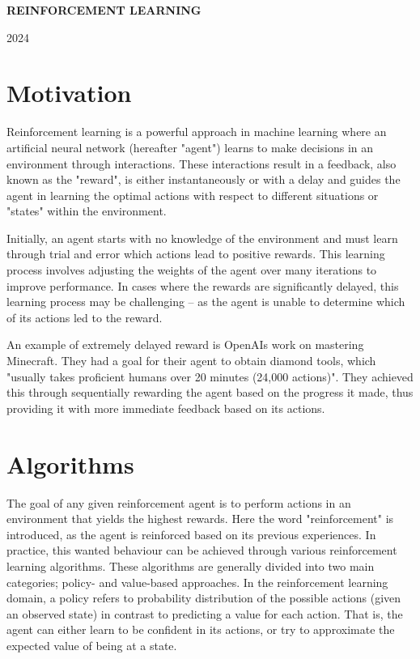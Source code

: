 \documentclass{article}
\let\oldcite\cite
\renewcommand{\cite}[1]{\textbf{\oldcite{#1}}}
\begin{document}
\begin{center}
    \textbf{\LARGE REINFORCEMENT LEARNING}

    \vspace{0.2cm}

    2024

\end{center}

\section*{Motivation}

Reinforcement learning is a powerful approach in machine learning where an artificial neural network (hereafter "agent") learns to make decisions in an environment through interactions. These interactions result in a feedback, also known as the "reward", is either instantaneously or with a delay and guides the agent in learning the optimal actions with respect to different situations or "states" within the environment.

Initially, an agent starts with no knowledge of the environment and must learn through trial and error which actions lead to positive rewards. This learning process involves adjusting the weights of the agent over many iterations to improve performance. In cases where the rewards are significantly delayed, this learning process may be challenging – as the agent is unable to determine which of its actions led to the reward.

An example of extremely delayed reward is OpenAIs work on mastering Minecraft. They had a goal for their agent to obtain diamond tools, which "usually takes proficient humans over 20 minutes (24,000 actions)". They achieved this through sequentially rewarding the agent based on the progress it made, thus providing it with more immediate feedback based on its actions. \cite{Minecraft}

\section*{Algorithms}

The goal of any given reinforcement agent is to perform actions in an environment that yields the highest rewards. Here the word "reinforcement" is introduced, as the agent is reinforced based on its previous experiences. In practice, this wanted behaviour can be achieved through various reinforcement learning algorithms. These algorithms are generally divided into two main categories; policy- and value-based approaches. In the reinforcement learning domain, a policy refers to probability distribution of the possible actions (given an observed state) in contrast to predicting a value for each action. That is, the agent can either learn to be confident in its actions, or try to approximate the expected value of being at a state.
\end{document}
